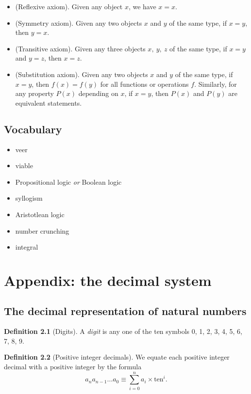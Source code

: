 \documentclass[
]{book}
\providecommand{\tightlist}{%
  \setlength{\itemsep}{0pt}\setlength{\parskip}{0pt}}
\theoremstyle{definition}
\newtheorem{definition}{Definition}[chapter]
\theoremstyle{definition}
\theoremstyle{definition}
\theoremstyle{definition}
\theoremstyle{remark}
\begin{document}
\begin{itemize}
\tightlist
\item
  (Reflexive axiom). Given any object \(x\), we have \(x=x\).
\item
  (Symmetry axiom). Given any two objects \(x\) and \(y\) of the same type, if \(x=y\), then \(y=x\).
\item
  (Transitive axiom). Given any three objects \(x,\ y,\ z\) of the same type, if \(x=y\) and \(y=z\), then \(x=z\).
\item
  (Substitution axiom). Given any two objects \(x\) and \(y\) of the same type, if \(x=y\), then \(f(x) = f(y)\) for all functions or operations \(f\). Similarly, for any property \(P(x)\) depending on \(x\), if \(x=y\), then \(P(x)\) and \(P(y)\) are equivalent statements.
\end{itemize}

\section{Vocabulary}\label{vocabulary-2}

\begin{itemize}
\tightlist
\item
  veer
\item
  viable
\item
  Propositional logic \emph{or} Boolean logic
\item
  syllogism
\item
  Aristotlean logic
\item
  number crunching
\item
  integral
\end{itemize}

\chapter{Appendix: the decimal system}\label{decimalism}

\section{The decimal representation of natural numbers}\label{the-decimal-representation-of-natural-numbers}

\begin{definition}[Digits]
A \emph{digit} is any one of the ten symbols 0, 1, 2, 3, 4, 5, 6, 7, 8, 9.
\end{definition}

\begin{definition}[Positive integer decimals]
We equate each positive integer decimal with a positive integer by the formula
\[
a_n a_{n-1}\dots a_0 \equiv \sum_{i=0}^n a_i \times \text{ten}^i.
\]
\end{definition}
\end{document}

